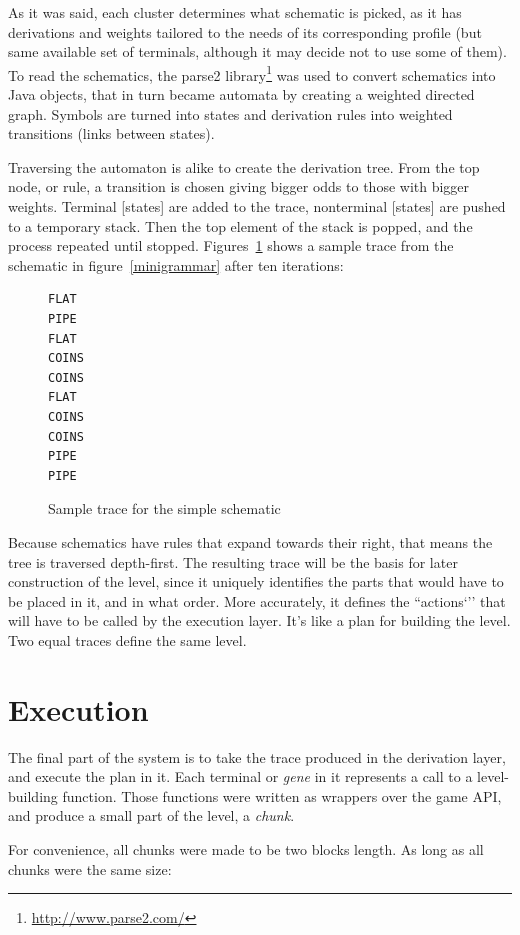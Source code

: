\documentclass[conference]{IEEEtran}
\begin{document}
As it was said, each cluster determines what schematic is picked, as it has derivations and weights tailored to the needs of its corresponding profile (but same available set of terminals, although it may decide not to use some of them). To read the schematics, the parse2 library\footnote{\url{http://www.parse2.com/}} was used to convert schematics into Java objects, that in turn became automata by creating a weighted directed graph. Symbols are turned into states and derivation rules into weighted transitions (links between states).

Traversing the automaton is alike to create the derivation tree. From the top node, or rule, a transition is chosen giving bigger odds to those with bigger weights. Terminal [states] are added to the trace, nonterminal [states] are pushed to a temporary stack. Then the top element of the stack is popped, and the process repeated until stopped. Figures~\ref{minitrace} shows a sample trace from the schematic in figure~\ref{minigrammar} after ten iterations:

\begin{figure}[htp]
	\begin{lstlisting}
FLAT
PIPE
FLAT
COINS
COINS
FLAT
COINS
COINS
PIPE
PIPE
	\end{lstlisting}
\caption{Sample trace for the simple schematic}
\label{minitrace}
\end{figure}

Because schematics have rules that expand towards their right, that means the tree is traversed depth-first. The resulting trace will be the basis for later construction of the level, since it uniquely identifies the parts that would have to be placed in it, and in what order. More accurately, it defines the ``actions`'' that will have to be called by the execution layer. It's like a plan for building the level. Two equal traces define the same level.


\section{Execution}
\label{execution}

The final part of the system is to take the trace produced in the derivation layer, and execute the plan in it. Each terminal or \textit{gene} in it represents a call to a level-building function. Those functions were written as wrappers over the game API, and produce a small part of the level, a \textit{chunk}.

For convenience, all chunks were made to be two blocks length. As long as all chunks were the same size:
\end{document}
